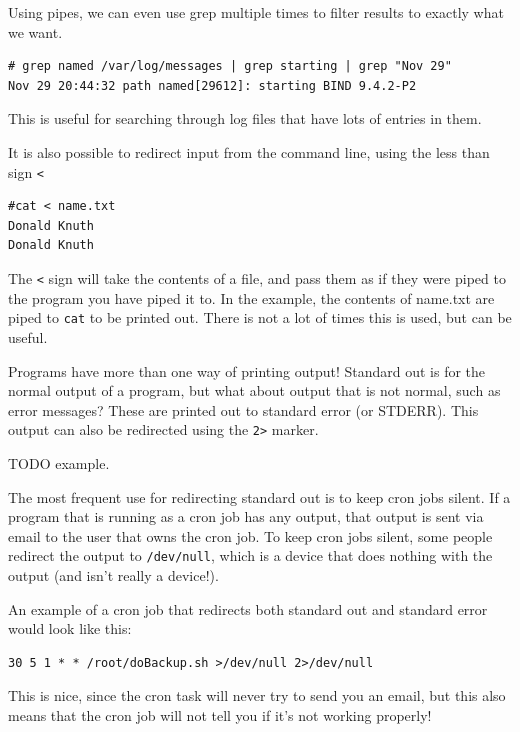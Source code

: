 Using pipes, we can even use grep multiple times to filter results to 
exactly what we want.

\begin{verbatim}
# grep named /var/log/messages | grep starting | grep "Nov 29" 
Nov 29 20:44:32 path named[29612]: starting BIND 9.4.2-P2
\end{verbatim}

This is useful for searching through log files that
have lots of entries in them.

It is also possible to redirect input from the command line, using the
less than sign {\tt < }

\begin{verbatim}
#cat < name.txt 
Donald Knuth
Donald Knuth
\end{verbatim}

The {\tt <} sign will take the contents of a file, and 
pass them as if they were piped to the program you 
have piped it to. In the example, the contents of name.txt
are piped to {\tt cat} to be printed out. There is not 
a lot of times this is used, but can be useful.


Programs have more than one way of printing output!
Standard out is for the normal output of a program, but what about 
output that is not normal, such as error messages? These are printed 
out to standard error (or STDERR). This output can also be redirected
using the {\tt 2>} marker.

TODO example. 

The most frequent use for redirecting standard out is to 
keep cron jobs silent. If a program that is running as a cron job
has any output, that output is sent via email to the user that
owns the cron job. To keep cron jobs silent, some people redirect the 
output to {\tt /dev/null}, which is a device that does nothing with the output (and isn't really a device!).

An example of a cron job that redirects both standard out and standard error would look like this:

\begin{verbatim}
30 5 1 * * /root/doBackup.sh >/dev/null 2>/dev/null
\end{verbatim}    

This is nice, since the cron task will never try to send you an email, 
but this also means that the cron job will not tell you if it's not working properly!

